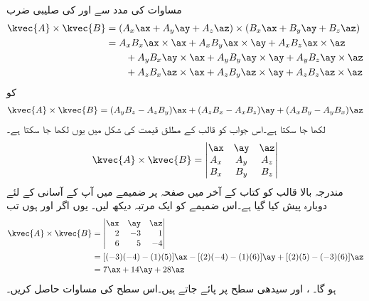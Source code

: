 مساوات  کی  مدد سے  اور  کی صلیبی ضرب
\begin{align*}
\kvec{A} \times \kvec{B}&=(A_x\ax+A_y\ay+A_z\az) \times (B_x\ax+B_y\ay+B_z\az)\\
&=A_x B_x \ax \times \ax+A_x B_y \ax \times \ay+A_x B_z \ax \times \az\\
& \quad \quad +A_y B_x \ay \times \ax+A_y B_y \ay \times \ay+A_y B_z \ay \times \az \\
&\quad \quad +A_z B_x \az \times \ax+A_z B_y \az \times \ay+A_z B_z \az \times \az
\end{align*}
کو
\begin{align}
\kvec{A} \times \kvec{B}=(A_y B_z-A_z B_y)\ax+(A_z B_x-A_x B_z)\ay+(A_x B_y-A_y B_x)\az
\end{align}
لکھا جا سکتا ہے۔اس جواب کو قالب کے مطلق قیمت کی شکل میں یوں لکھا جا سکتا ہے۔
\begin{align}\label{مساوات_سمتیات_سمتی_ضرب_قالب_شکل}
\kvec{A} \times \kvec{B}=\begin{vmatrix}
\ax & \ay & \az\\
A_x & A_y & A_z\\
B_x & B_y & B_z
\end{vmatrix}
\end{align}
مندرجہ بالا قالب کو کتاب کے آخر میں صفحہ  پر ضمیمے میں آپ کے آسانی کے لئے دوبارہ پیش کیا گیا ہے۔اس ضمیمے کو ایک مرتبہ دیکھ لیں۔
یوں اگر  اور  ہوں تب
\begin{align*}
\kvec{A} \times \kvec{B}&=\begin{vmatrix*}[r]
\ax & \ay & \az\\
2 & -3 & 1\\
6 & 5 & -4
\end{vmatrix*}\\
&=[(-3)(-4)-(1)(5)]\ax-[(2)(-4)-(1)(6)]\ay+[(2)(5)-(-3)(6)]\az\\
&=7\ax+14\ay+28\az
\end{align*}
ہو گا۔
،  اور  سیدھی سطح پر پائے جاتے ہیں۔اس سطح کی مساوات حاصل کریں۔

